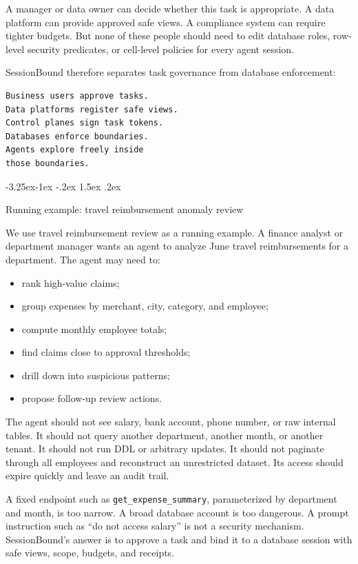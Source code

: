 \documentclass[10pt,twocolumn]{article}
\makeatletter
\providecommand{\tightlist}{%
  \setlength{\itemsep}{0pt}\setlength{\parskip}{0pt}}
\renewcommand\subsection{\@startsection{subsection}{2}{\z@}%
  {-3.25ex\@plus -1ex \@minus -.2ex}%
  {1.5ex \@plus .2ex}%
  {\normalfont\large\bfseries\raggedright}}
\makeatother
\begin{document}
A manager or data owner can decide whether this task is appropriate. A
data platform can provide approved safe views. A compliance system can
require tighter budgets. But none of these people should need to edit
database roles, row-level security predicates, or cell-level policies
for every agent session.

SessionBound therefore separates task governance from database
enforcement:

\begin{verbatim}
Business users approve tasks.
Data platforms register safe views.
Control planes sign task tokens.
Databases enforce boundaries.
Agents explore freely inside
those boundaries.
\end{verbatim}

\hypertarget{running-example-travel-reimbursement-anomaly-review}{%
\subsection{Running example: travel reimbursement anomaly
review}\label{running-example-travel-reimbursement-anomaly-review}}

We use travel reimbursement review as a running example. A finance
analyst or department manager wants an agent to analyze June travel
reimbursements for a department. The agent may need to:

\begin{itemize}
\tightlist
\item
  rank high-value claims;
\item
  group expenses by merchant, city, category, and employee;
\item
  compute monthly employee totals;
\item
  find claims close to approval thresholds;
\item
  drill down into suspicious patterns;
\item
  propose follow-up review actions.
\end{itemize}

The agent should not see salary, bank account, phone number, or raw
internal tables. It should not query another department, another month,
or another tenant. It should not run DDL or arbitrary updates. It should
not paginate through all employees and reconstruct an unrestricted
dataset. Its access should expire quickly and leave an audit trail.

A fixed endpoint such as \texttt{get\_expense\_summary}, parameterized
by department and month, is too narrow. A broad database account is too
dangerous. A prompt instruction such as ``do not access salary'' is not
a security mechanism. SessionBound's answer is to approve a task and
bind it to a database session with safe views, scope, budgets, and
receipts.
\end{document}
